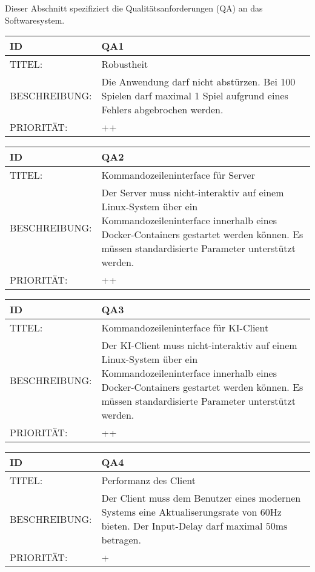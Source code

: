 Dieser Abschnitt spezifiziert die Qualitätsanforderungen (QA) an das Softwaresystem.

\begin{tabularx}{16cm}{l|X}
	 \textbf{ID} & \textbf{QA1} \\
	 \hline
	 TITEL: & Robustheit \\
	 \hline 
	 BESCHREIBUNG: & Die Anwendung darf nicht abstürzen. Bei 100 Spielen darf maximal 1 Spiel
	aufgrund eines Fehlers abgebrochen werden. \\
	\hline
	 PRIORITÄT: & ++\\
\end{tabularx}


\begin{tabularx}{16cm}{l|X}
	 \textbf{ID} & \textbf{QA2} \\
	 \hline
	 TITEL: & Kommandozeileninterface für Server \\
	 \hline 
	 BESCHREIBUNG: & Der Server muss nicht-interaktiv auf einem Linux-System über ein Kommandozeileninterface innerhalb eines Docker-Containers gestartet werden können. Es müssen standardisierte Parameter unterstützt werden.\\ 
	 \hline
	 PRIORITÄT: & ++\\
\end{tabularx} 


\begin{tabularx}{16cm}{l|X}
	 \textbf{ID} & \textbf{QA3} \\
	 \hline
	 TITEL: & Kommandozeileninterface für KI-Client \\
	 \hline 
	 BESCHREIBUNG: & Der KI-Client muss nicht-interaktiv auf einem Linux-System über ein Kommandozeileninterface innerhalb eines Docker-Containers gestartet werden können. Es müssen standardisierte Parameter unterstützt werden.\\ 
	 \hline
	 PRIORITÄT: & ++\\
\end{tabularx} 


\begin{tabularx}{16cm}{l|X}
	 \textbf{ID} & \textbf{QA4} \\
	 \hline
		TITEL: & Performanz des Client \\
	 \hline 
	 BESCHREIBUNG: & Der Client muss dem Benutzer eines modernen Systems eine Aktualiserungsrate von $60\si{\hertz}$ bieten. Der Input-Delay darf maximal $50\si{\milli\second}$ betragen.\\ 
	 \hline
	 PRIORITÄT: & +\\
\end{tabularx} 


